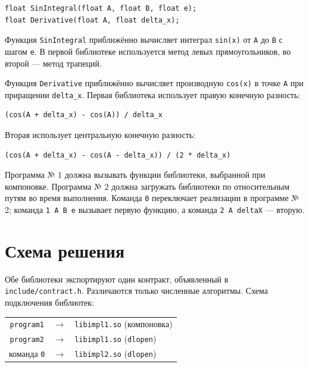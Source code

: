 \documentclass[12pt,a4paper]{article}
\begin{document}
\begin{verbatim}
float SinIntegral(float A, float B, float e);
float Derivative(float A, float delta_x);
\end{verbatim}

Функция \texttt{SinIntegral} приближённо вычисляет интеграл \texttt{sin(x)}
от \texttt{A} до \texttt{B} с шагом \texttt{e}. В первой библиотеке используется
метод левых прямоугольников, во второй --- метод трапеций.

Функция \texttt{Derivative} приближённо вычисляет производную \texttt{cos(x)}
в точке \texttt{A} при приращении \texttt{delta\_x}. Первая библиотека
использует правую конечную разность:

\begin{verbatim}
(cos(A + delta_x) - cos(A)) / delta_x
\end{verbatim}

Вторая использует центральную конечную разность:

\begin{verbatim}
(cos(A + delta_x) - cos(A - delta_x)) / (2 * delta_x)
\end{verbatim}

Программа № 1 должна вызывать функции библиотеки, выбранной при компоновке.
Программа № 2 должна загружать библиотеки по относительным путям во время
выполнения. Команда \texttt{0} переключает реализации в программе № 2;
команда \texttt{1 A B e} вызывает первую функцию, а команда
\texttt{2 A deltaX} --- вторую.

\section{Схема решения}

Обе библиотеки экспортируют один контракт, объявленный в
\texttt{include/contract.h}. Различаются только численные алгоритмы.
Схема подключения библиотек:

\begin{center}
\begin{tabular}{ccl}
\texttt{program1} & $\longrightarrow$ & \texttt{libimpl1.so} (компоновка) \\
\texttt{program2} & $\longrightarrow$ & \texttt{libimpl1.so} (\texttt{dlopen}) \\
команда \texttt{0} & $\longrightarrow$ & \texttt{libimpl2.so} (\texttt{dlopen}) \\
\end{tabular}
\end{center}
\end{document}
